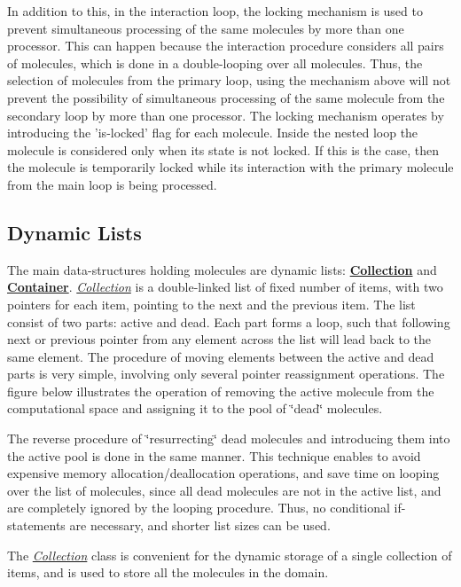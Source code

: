 In addition to this, in the interaction loop, the locking mechanism is used to prevent simultaneous processing of the same molecules by more than one processor. This can happen because the interaction procedure considers all pairs of molecules, which is done in a double-looping over all molecules. Thus, the selection of molecules from the primary loop, using the mechanism above will not prevent the possibility of simultaneous processing of the same molecule from the secondary loop by more than one processor. The locking mechanism operates by introducing the 'is-locked' flag for each molecule. Inside the nested loop the molecule is considered only when its state is not locked. If this is the case, then the molecule is temporarily locked while its interaction with the primary molecule from the main loop is being processed.\hypertarget{Implementation_SLists}{}\subsection{Dynamic Lists}\label{Implementation_SLists}
The main data-structures holding molecules are dynamic lists: {\bf \hyperlink{classCollection}{Collection}} and {\bf \hyperlink{classContainer}{Container}}. {\em \hyperlink{classCollection}{Collection}\/} is a double-linked list of fixed number of items, with two pointers for each item, pointing to the next and the previous item. The list consist of two parts: active and dead. Each part forms a loop, such that following next or previous pointer from any element across the list will lead back to the same element. The procedure of moving elements between the active and dead parts is very simple, involving only several pointer reassignment operations. The figure below illustrates the operation of removing the active molecule from the computational space and assigning it to the pool of \char`\"{}dead\char`\"{} molecules.



The reverse procedure of \char`\"{}resurrecting\char`\"{} dead molecules and introducing them into the active pool is done in the same manner. This technique enables to avoid expensive memory allocation/deallocation operations, and save time on looping over the list of molecules, since all dead molecules are not in the active list, and are completely ignored by the looping procedure. Thus, no conditional if-statements are necessary, and shorter list sizes can be used.

The {\em \hyperlink{classCollection}{Collection}\/} class is convenient for the dynamic storage of a single collection of items, and is used to store all the molecules in the domain.

